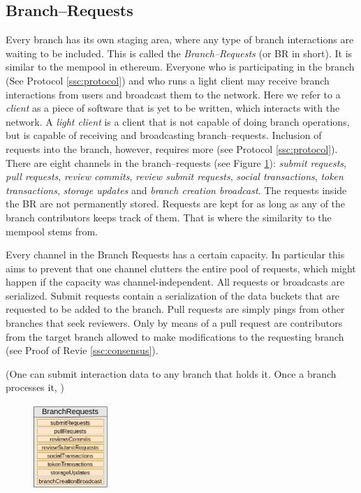 \documentclass[14pt]{article}
\newcommand{\remark}[1]{{\color{purple} (#1)}}
\begin{document}
\subsection{Branch--Requests}

Every branch has its own staging area, where any type of branch interactions are waiting to be included. This is called the \textit{Branch--Requests} (or BR in short). It is similar to the mempool in ethereum. Everyone who is participating in the branch (See Protocol \ref{ssc:protocol}) and who runs a light client may receive branch interactions from users and broadcast them to the network. Here we refer to a \textit{client} as a piece of software that is yet to be written, which interacts with the network. A \textit{light client} is a client that is not capable of doing branch operations, but is capable of receiving and broadcasting branch--requests. Inclusion of requests into the branch, however, requires more (see Protocol \ref{ssc:protocol}). There are eight channels in the branch--requests (see Figure \ref{fig:mempool}): \textit{submit requests}, \textit{pull requests}, \textit{review commits}, \textit{review submit requests}, \textit{social transactions}, \textit{token transactions}, \textit{storage updates} and \textit{branch creation broadcast}. The requests inside the BR are not permanently stored. Requests are kept for as long as any of the branch contributors keeps track of them. That is where the similarity to the mempool stems from.

Every channel in the Branch Requests has a certain capacity. In particular this aims to prevent that one channel clutters the entire pool of requests, which might happen if the capacity was channel-independent. All requests or broadcasts are serialized. 
Submit requests contain a serialization of the data buckets that are requested to be added to the branch. Pull requests are simply pings from other branches that seek reviewers. Only by means of a pull request are contributors from the target branch allowed to make modifications to the requesting branch (see Proof of Revie \ref{ssc:consensus}).


\remark{One can submit interaction data to any branch that holds it. Once a branch processes it, }



\begin{figure}[h!]
  \begin{center}
    \includegraphics[width=0.25\textwidth]{src/img/MempoolV3.png}
\end{center}
 \caption{}
 \label{fig:mempool}
\end{figure}
\end{document}
